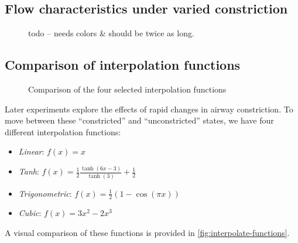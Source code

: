 \subsection{Flow characteristics under varied constriction}

\begin{figure}[ht!]
    \centering
    \begin{tikzpicture}
        
    \end{tikzpicture}
    \caption{ todo -- needs colors \& should be twice as long. }
    \label{fig:constricted-flow-characteristics}
\end{figure}


\subsection{Comparison of interpolation functions}

\begin{figure}[ht!]
    \centering
    \begin{tikzpicture}
        
    \end{tikzpicture}
    \caption{Comparison of the four selected interpolation functions}
\end{figure}

Later experiments explore the effects of rapid changes in airway constriction. To move between these
``constricted'' and ``unconstricted'' states, we have four different interpolation functions:

\begin{itemize}
    \item \textit{Linear}: $f(x) = x$
    \item \textit{Tanh}: $f(x) = \frac{1}{2} \frac{\tanh(6x - 3)}{\tanh(3)} + \frac{1}{2}$
    \item \textit{Trigonometric}: $f(x) = \frac{1}{2} (1 - \cos(\pi x))$
    \item \textit{Cubic}: $f(x) = 3x^2 - 2x^3$
\end{itemize}

\noindent
A visual comparison of these functions is provided in \autoref{fig:interpolate-functions}.

